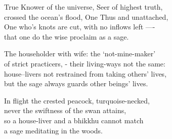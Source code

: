 \begin{MyDescription}{}
True Knower of the universe, Seer of highest truth,\\
crossed the ocean's ﬂood, One Thus and unattached,\\
One who's knots are cut, with no inﬂows left —-\\
that one do the wise proclaim as a sage.
\end{MyDescription}


\begin{MyDescription}{}
The householder with wife: the `not-mine-maker'\\
of strict practicers, - their living-ways not the same:\\
house--livers not restrained from taking others' lives,\\
but the sage always guards other beings' lives.
\end{MyDescription}

\begin{MyDescription}{}
In flight the crested peacock, turquoise-necked,\\
never the swiftness of the swan attains,\\
so a house-liver and a bhikkhu cannot match\\
a sage meditating in the woods.
\end{MyDescription}
  
\begin{MyDescription}[(Sn. 207--221)]{}
\end{MyDescription}      
\newpage  
